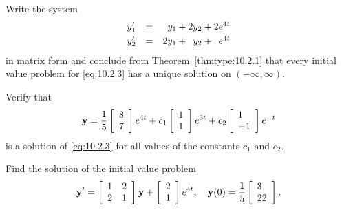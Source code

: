 \begin{example}
  \label{example:10.2.1} \rm \mbox{}
  \newline
  \begin{alist}
    \item %
    Write the system
    \begin{equation}
      \label{eq:10.2.3}
      \begin{array}{rcl}
        y_{1}' & = & \phantom{2}y_{1}+2y_{2}+2e^{4t}           \\[1\jot]
        y_{2}' & = & 2y_{1}+\phantom{2}y_{2}+\phantom{2}e^{4t}
      \end{array}
    \end{equation}
    in matrix form and conclude from Theorem~\ref{thmtype:10.2.1} that every initial value problem
    for \eqref{eq:10.2.3} has a unique solution on $(-\infty,\infty)$.

    \item %
    Verify that
    \begin{equation}
      \label{eq:10.2.4}{\bf y}= \frac{1}{5}\left[\begin{array}{l}8\\7\end{array}\right]e^{4t}+c_{1}\left[\begin{array}{l}1\\1\end{array}\right]e^{3t}+c_{2}\left[\begin{array}{l}1\\-1\end{array}\right]e^{-t}
    \end{equation}
    is a solution of \eqref{eq:10.2.3} for all values of the constants $c_{1}$ and $c_{2}$.

    \item %
    Find the solution of the initial value problem
    \begin{equation}
      \label{eq:10.2.5}{\bf y}'=\left[\begin{array}{rr} 1&2\\2&1\end{array}\right]{\bf y}+\left[\begin{array}{l}2\\1\end{array}\right]e^{4t},\quad{\bf y}(0)=\frac{1}{5}\left[\begin{array}{l}3\\22\end{array}\right].
    \end{equation}
  \end{alist}
\end{example}

